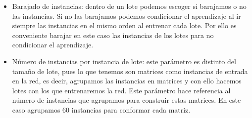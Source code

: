\begin{itemize}
	\item Barajado de instancias: dentro de un lote podemos escoger si barajamos o no las instancias. Si no las barajamos podemos condicionar el aprendizaje al ir siempre las instancias en el mismo orden al entrenar cada lote. Por ello es conveniente barajar en este caso las instancias de los lotes para no condicionar el aprendizaje.
	\item Número de instancias por instancia de lote: este parámetro es distinto del tamaño de lote, pues lo que tenemos son matrices como instancias de entrada en la red, es decir, agrupamos las instancias en matrices y con ello hacemos lotes con los que entrenaremos la red. Este parámetro hace referencia al número de instancias que agrupamos para construir estas matrices. En este caso agrupamos 60 instancias para conformar cada matriz.
\end{itemize}

